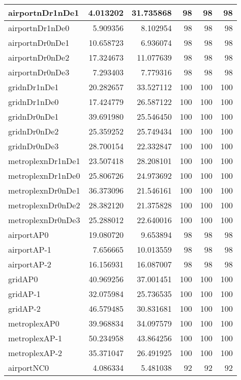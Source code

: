 \begin{longtable}{|l|r|r|r|r|r|}
\endlastfoot
airportnDr1nDe1 & 4.013202 & 31.735868 & 98 & 98 & 98 \\ \hline
airportnDr1nDe0 & 5.909356 & 8.102954 & 98 & 98 & 98 \\ \hline
airportnDr0nDe1 & 10.658723 & 6.936074 & 98 & 98 & 98 \\ \hline
airportnDr0nDe2 & 17.324673 & 11.077639 & 98 & 98 & 98 \\ \hline
airportnDr0nDe3 & 7.293403 & 7.779316 & 98 & 98 & 98 \\ \hline
gridnDr1nDe1 & 20.282657 & 33.527112 & 100 & 100 & 100 \\ \hline
gridnDr1nDe0 & 17.424779 & 26.587122 & 100 & 100 & 100 \\ \hline
gridnDr0nDe1 & 39.691980 & 25.546450 & 100 & 100 & 100 \\ \hline
gridnDr0nDe2 & 25.359252 & 25.749434 & 100 & 100 & 100 \\ \hline
gridnDr0nDe3 & 28.700154 & 22.332847 & 100 & 100 & 100 \\ \hline
metroplexnDr1nDe1 & 23.507418 & 28.208101 & 100 & 100 & 100 \\ \hline
metroplexnDr1nDe0 & 25.806726 & 24.973692 & 100 & 100 & 100 \\ \hline
metroplexnDr0nDe1 & 36.373096 & 21.546161 & 100 & 100 & 100 \\ \hline
metroplexnDr0nDe2 & 28.382120 & 21.375828 & 100 & 100 & 100 \\ \hline
metroplexnDr0nDe3 & 25.288012 & 22.640016 & 100 & 100 & 100 \\ \hline
airportAP0 & 19.080720 & 9.653894 & 98 & 98 & 98 \\ \hline
airportAP-1 & 7.656665 & 10.013559 & 98 & 98 & 98 \\ \hline
airportAP-2 & 16.156931 & 16.087007 & 98 & 98 & 98 \\ \hline
gridAP0 & 40.969256 & 37.001451 & 100 & 100 & 100 \\ \hline
gridAP-1 & 32.075984 & 25.736535 & 100 & 100 & 100 \\ \hline
gridAP-2 & 46.579485 & 30.831681 & 100 & 100 & 100 \\ \hline
metroplexAP0 & 39.968834 & 34.097579 & 100 & 100 & 100 \\ \hline
metroplexAP-1 & 50.234958 & 43.864256 & 100 & 100 & 100 \\ \hline
metroplexAP-2 & 35.371047 & 26.491925 & 100 & 100 & 100 \\ \hline
airportNC0 & 4.086334 & 5.481038 & 92 & 92 & 92 \\ \hline

\end{longtable}
